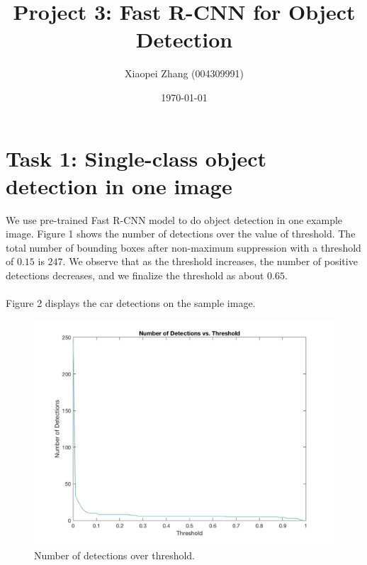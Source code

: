 \documentclass[10pt]{article}
\title{Project 3: Fast R-CNN for Object Detection}
\author{Xiaopei Zhang (004309991)}
\date{\today}
\begin{document}
\maketitle
\section*{\large{Task 1: Single-class object detection in one image}}
	We use pre-trained Fast R-CNN model to do object detection in one example image. Figure 1 shows the number of detections over the value of threshold. The total number of bounding boxes after non-maximum suppression with a threshold of $0.15$ is $247$. We observe that as the threshold increases, the number of positive detections decreases, and we finalize the threshold as about $0.65$. 
	\\\\Figure 2 displays the car detections on the sample image.\\ 
	\begin{figure}[ht]
		\includegraphics[width=\textwidth]{threshold_vs_numberOfDetection.jpg}
		\centering
		\caption{Number of detections over threshold.}
		\label{1}
	\end{figure}\\
\end{document}
